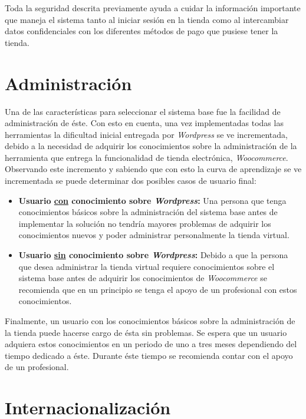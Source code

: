Toda la seguridad descrita previamente ayuda a cuidar la información importante que maneja el sistema 
tanto al iniciar sesión en la tienda como al intercambiar datos confidenciales con los diferentes 
métodos de pago que pusiese tener la tienda.

\section{Administración}

Una de las características para seleccionar el sistema base fue la facilidad de 
administración de éste. Con esto en cuenta, una vez implementadas todas las herramientas la
dificultad inicial entregada por \emph{Wordpress} se ve incrementada, debido a la necesidad de adquirir los 
conocimientos sobre la administración de la herramienta que entrega la funcionalidad de tienda electrónica,
 \emph{Woocommerce}. Observando este incremento y sabiendo que con esto la curva de aprendizaje se
ve incrementada se puede determinar dos posibles casos de usuario final:

\begin{itemize}

\item {\bf Usuario \underline{con} conocimiento sobre \emph{Wordpress}:} Una persona que tenga conocimientos básicos 
sobre la administración del sistema base antes de implementar la solución no tendría mayores problemas de
adquirir los conocimientos nuevos y poder administrar personalmente la tienda virtual.

\item {\bf Usuario \underline{sin} conocimiento sobre \emph{Wordpress}:} Debido a que la persona que desea administrar
la tienda virtual requiere conocimientos sobre el sistema base antes de adquirir los conocimientos de 
\emph{Woocommerce} se recomienda que en un principio se tenga el apoyo de un profesional con estos conocimientos.

\end{itemize}  

Finalmente, un usuario con los conocimientos básicos sobre la administración de la tienda puede hacerse cargo de ésta
sin problemas. Se espera que un usuario adquiera estos conocimientos en un periodo de uno a tres meses dependiendo
del tiempo dedicado a éste. Durante éste tiempo se recomienda contar con el apoyo de un profesional. 

\section{Internacionalización}

